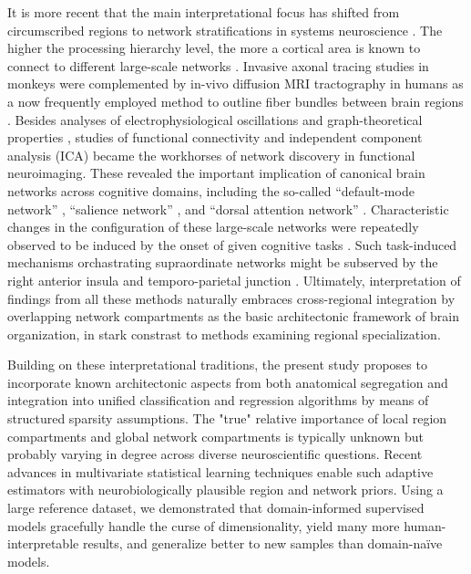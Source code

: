 \documentclass{article} %
\begin{document}
It is more recent
that the main interpretational focus has shifted
from circumscribed regions to network stratifications
in systems neuroscience \cite{yuste2015, stephan_dys}.
The higher the processing hierarchy level,
the more a cortical area is known to
connect to different large-scale networks
\cite{yeo11}.
%
Invasive axonal tracing studies in monkeys were complemented
by in-vivo diffusion MRI tractography in humans
as a now frequently employed method to
outline fiber bundles between brain regions
\cite{jbabdi2013long}.
Besides analyses of
electrophysiological oscillations
\cite{buzsaki2004neuronal}
and
graph-theoretical properties \cite{bullmore2009complex},
studies of
functional connectivity \cite{buckner2013opportunities} and
independent component analysis (ICA) \cite{beckmann2005}
became the workhorses of network discovery
in functional neuroimaging.
These revealed the important implication of
canonical brain networks across cognitive domains,
including the so-called
``default-mode network'' \cite{raichle2001pnas},
``salience network'' \cite{seeley2007dissociable},
and ``dorsal attention network'' \cite{corbettashul2008}. 
Characteristic changes in the configuration of
these large-scale networks
were repeatedly observed to be induced
by the onset of given cognitive tasks \cite{fransson2006}.
Such task-induced mechanisms orchastrating supraordinate networks
might be subserved by the right anterior insula \cite{sridh2008}
and temporo-parietal junction \cite{bzdok2013tpj}.
%
Ultimately,
interpretation of findings from all these methods naturally embraces
cross-regional integration by
overlapping network compartments
as the basic architectonic framework of brain organization,
in stark constrast to methods examining regional specialization.



Building on these interpretational traditions,
the present study proposes to incorporate
known architectonic aspects from both
anatomical segregation and integration
into unified classification and regression algorithms
by means  of structured sparsity assumptions.
The "true" relative importance of 
local region compartments and global network compartments
is typically unknown
but
probably varying in degree
across diverse neuroscientific questions.
Recent advances in multivariate statistical learning techniques
enable such adaptive estimators with
neurobiologically plausible region and network priors.
Using a large reference dataset,
we demonstrated that domain-informed supervised models
gracefully handle the curse of dimensionality,
yield many more human-interpretable results,
and generalize better to new samples
than domain-na\"ive models.
\end{document}
